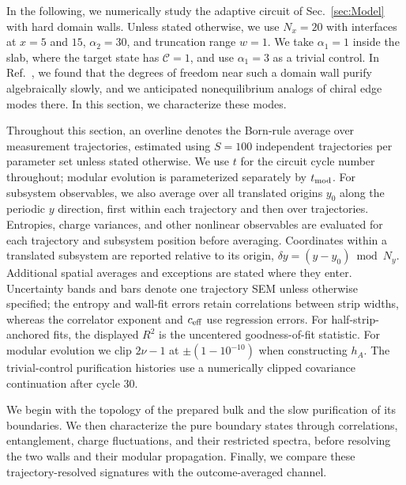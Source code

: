 \documentclass[aps,prb,10pt,twocolumn,superscriptaddress,longbibliography,floatfix]{revtex4-2}
\newcommand{\mc}[1]{\mathcal{#1}}
\begin{document}
In the following, we numerically study the adaptive circuit of Sec.~\ref{sec:Model} with hard domain walls. Unless stated otherwise, we use $N_x=20$ with interfaces at $x=5$ and $15$, $\alpha_2=30$, and truncation range $w=1$. We take $\alpha_1=1$ inside the slab, where the target state has $\mc C=1$, and use $\alpha_1=3$ as a trivial control. In Ref.~\cite{BhuiyanPanJian2026}, we found that the degrees of freedom near such a domain wall purify algebraically slowly, and we anticipated nonequilibrium analogs of chiral edge modes there. In this section, we characterize these modes.
{\color{blue}
Throughout this section, an overline denotes the Born-rule average over measurement trajectories, estimated using $S=100$ independent trajectories per parameter set unless stated otherwise. We use $t$ for the circuit cycle number throughout; modular evolution is parameterized separately by $t_{\rm mod}$. For subsystem observables, we also average over all translated origins $y_0$ along the periodic $y$ direction, first within each trajectory and then over trajectories. Entropies, charge variances, and other nonlinear observables are evaluated for each trajectory and subsystem position before averaging. Coordinates within a translated subsystem are reported relative to its origin, $\delta y=(y-y_0)\bmod N_y$. Additional spatial averages and exceptions are stated where they enter. Uncertainty bands and bars denote one trajectory SEM unless otherwise specified; the entropy and wall-fit errors retain correlations between strip widths, whereas the correlator exponent and $c_{\rm eff}$ use regression errors. For half-strip-anchored fits, the displayed $R^2$ is the uncentered goodness-of-fit statistic. For modular evolution we clip $2\nu-1$ at $\pm(1-10^{-10})$ when constructing $h_A$. The trivial-control purification histories use a numerically clipped covariance continuation after cycle 30.

 We begin with the topology of the prepared bulk and the slow purification of its boundaries. We then characterize the pure boundary states through correlations, entanglement, charge fluctuations, and their restricted spectra, before resolving the two walls and their modular propagation. Finally, we compare these trajectory-resolved signatures with the outcome-averaged channel.
}
\end{document}
